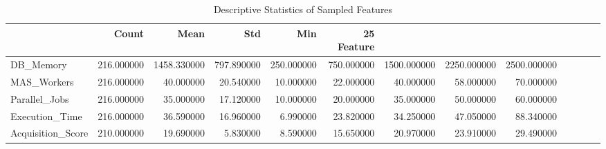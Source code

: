 \begin{table}
\caption{Descriptive Statistics of Sampled Features}
\label{tab:data_summary}
\begin{tabular}{lrrrrrrrr}
\toprule
 & Count & Mean & Std & Min & 25%
Feature &  &  &  &  &  &  &  &  \\
\midrule
DB_Memory & 216.000000 & 1458.330000 & 797.890000 & 250.000000 & 750.000000 & 1500.000000 & 2250.000000 & 2500.000000 \\
MAS_Workers & 216.000000 & 40.000000 & 20.540000 & 10.000000 & 22.000000 & 40.000000 & 58.000000 & 70.000000 \\
Parallel_Jobs & 216.000000 & 35.000000 & 17.120000 & 10.000000 & 20.000000 & 35.000000 & 50.000000 & 60.000000 \\
Execution_Time & 216.000000 & 36.590000 & 16.960000 & 6.990000 & 23.820000 & 34.250000 & 47.050000 & 88.340000 \\
Acquisition_Score & 210.000000 & 19.690000 & 5.830000 & 8.590000 & 15.650000 & 20.970000 & 23.910000 & 29.490000 \\
\bottomrule
\end{tabular}
\end{table}
